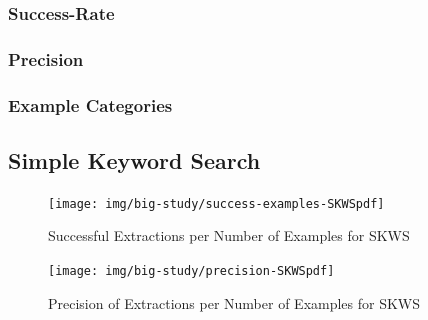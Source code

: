\documentclass[\myrootdir/main.tex]{subfiles}
\begin{document}
\subsubsection{Success-Rate}
\subsubsection{Precision}
\subsubsection{Example Categories}


\subsection{Simple Keyword Search}

\begin{figure}[htbp]
	\centering
	\begin{minipage}{0.45\textwidth}
		\centering
		\texttt{[image: img/big-study/success-examples-SKWSpdf]}
		\caption{Successful Extractions per Number of Examples for SKWS}
		\label{fig:success-examples-skws}
	\end{minipage}\hfill
	\begin{minipage}{0.45\textwidth}
		\centering
		\texttt{[image: img/big-study/precision-SKWSpdf]}
		\caption{Precision of Extractions per Number of Examples for SKWS}
		\label{fig:precision-skws}
	\end{minipage}
\end{figure}
\end{document}
